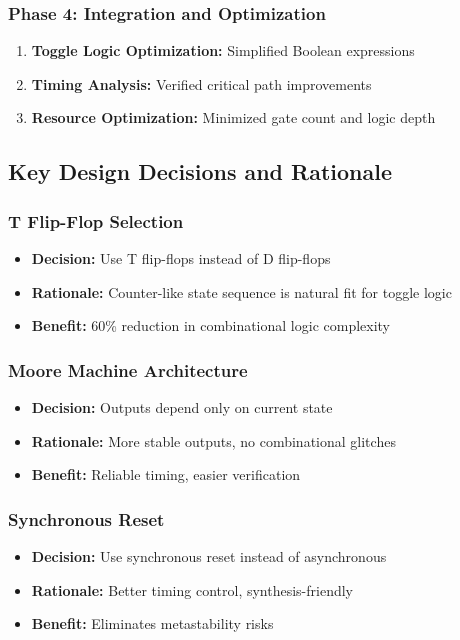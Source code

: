 \documentclass[12pt,letterpaper]{article}
\begin{document}
\subsubsection{Phase 4: Integration and Optimization}
\begin{enumerate}
    \item \textbf{Toggle Logic Optimization:} Simplified Boolean expressions
    \item \textbf{Timing Analysis:} Verified critical path improvements
    \item \textbf{Resource Optimization:} Minimized gate count and logic depth
\end{enumerate}

\subsection{Key Design Decisions and Rationale}

\subsubsection{T Flip-Flop Selection}
\begin{itemize}
    \item \textbf{Decision:} Use T flip-flops instead of D flip-flops
    \item \textbf{Rationale:} Counter-like state sequence is natural fit for toggle logic
    \item \textbf{Benefit:} 60\% reduction in combinational logic complexity
\end{itemize}

\subsubsection{Moore Machine Architecture}
\begin{itemize}
    \item \textbf{Decision:} Outputs depend only on current state
    \item \textbf{Rationale:} More stable outputs, no combinational glitches
    \item \textbf{Benefit:} Reliable timing, easier verification
\end{itemize}

\subsubsection{Synchronous Reset}
\begin{itemize}
    \item \textbf{Decision:} Use synchronous reset instead of asynchronous
    \item \textbf{Rationale:} Better timing control, synthesis-friendly
    \item \textbf{Benefit:} Eliminates metastability risks
\end{itemize}
\end{document}
